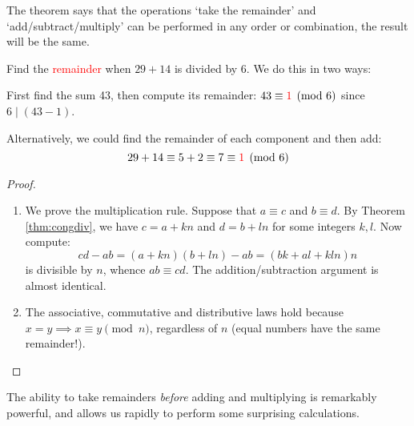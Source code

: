 The theorem says that the operations `take the remainder' and `add/subtract/multiply' can be performed in any order or combination, the result will be the same.

\begin{example}{}{}
	Find the \textcolor{red}{remainder} when $29+14$ is divided by 6. We do this in two ways:
	\begin{enumeratea}\itemsep0pt
		\item First find the sum 43, then compute its remainder: $43\equiv\textcolor{red}{1}\pmod 6$ since $6\mid(43-1)$.
		\item Alternatively, we could find the remainder of each component and then add:
		\[
			29+14\equiv 5+2\equiv 7\equiv \textcolor{red}{1}\pmod 6
		\]
	\end{enumeratea}
\end{example}


\begin{proof}
	\begin{enumerate}
	  \item We prove the multiplication rule. Suppose that $a\equiv c$ and $b\equiv d$. By Theorem \ref{thm:congdiv}, we have $c=a+kn$ and $d=b+ln$ for some integers $k,l$. Now compute:
		\[
			cd-ab=(a+kn)(b+ln)-ab =(bk+al+kln)n
		\]
		is divisible by $n$, whence $ab\equiv cd$. The addition/subtraction argument is almost identical.
		\item The associative, commutative and distributive laws hold because $x=y\implies x\equiv y\pmod n$, regardless of $n$ (equal numbers have the same remainder!).\qedhere
	\end{enumerate}	  
\end{proof}

The ability to take remainders \emph{before} adding and multiplying is remarkably powerful, and allows us rapidly to perform some surprising calculations.


